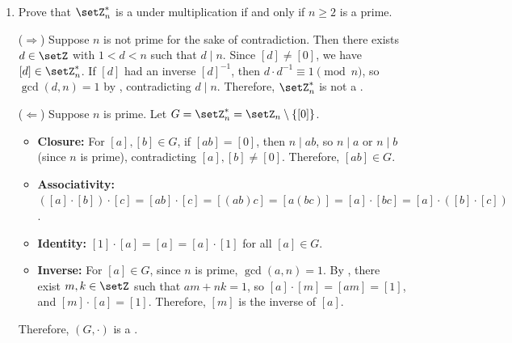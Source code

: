 \begin{enumerate}
\begin{subprove}
\begin{center}
\begin{tabular}{|c|c|c|c|c|c|}
    \hline
    \([3]\) & \([3]\) & \([0]\) & \([3]\) & \([0]\) & \([3]\) \\
    \hline
    \([4]\) & \([4]\) & \([2]\) & \([0]\) & \([4]\) & \([2]\) \\
    \hline
    \([5]\) & \([5]\) & \([4]\) & \([3]\) & \([2]\) & \([1]\) \\
    \hline
    \end{tabular}
    \end{center}
    \((\setZ_{6}^{*}, \cdot)\) is \textbf{NOT} a : not closed since \([2] \cdot [3] = [0] \notin \setZ_{6}^{*}\). Since \(6\) is not prime, \(\gcd(2, 6) = 2 \neq 1\) and \(\gcd(3, 6) = 3 \neq 1\). By , there are no \(m, k \in \setZ\) such that \(2 m + 6 k = 1\) or \(3 m + 6 k = 1\), so \([2]\) and \([3]\) have no multiplicative inverses.
  \end{subprove}
  \newpage
  \item Prove that \(\setZ_{n}^{*}\) is a  under 
  multiplication if and only if \(n \geq 2\) is a prime.
  \begin{subprove}
    (\(\Rightarrow\)) Suppose \(n\) is not prime for the sake of contradiction. 
    Then there exists \(d \in \setZ\) with \(1 < d < n\) such that \(d \mid n\).
    Since \([d] \neq [0]\), we have \([d] \in \setZ_{n}^{*}\). 
    If \([d]\) had an inverse \([d]^{-1}\), then 
    \(d \cdot d^{-1} \equiv 1 \pmod{n}\), so \(\gcd(d, n) = 1\) 
    by , contradicting \(d \mid n\). 
    Therefore, \(\setZ_{n}^{*}\) is not a .

    (\(\Leftarrow\)) Suppose \(n\) is prime. Let \(G = \setZ_{n}^{*} = \setZ_{n} \setminus \{[0]\}\).
    \begin{itemize}
      \item \textbf{Closure:} For \([a], [b] \in G\), if \([a b] = [0]\), then \(n \mid a b\), so \(n \mid a\) or \(n \mid b\) (since \(n\) is prime), contradicting \([a], [b] \neq [0]\). Therefore, \([a b] \in G\).
      \item \textbf{Associativity:} \(([a] \cdot [b]) \cdot [c] = [a b] \cdot [c] = [(a b) c] = [a (b c)] = [a] \cdot [b c] = [a] \cdot ([b] \cdot [c])\).
      \item \textbf{Identity:} \([1] \cdot [a] = [a] = [a] \cdot [1]\) for all \([a] \in G\).
      \item \textbf{Inverse:} For \([a] \in G\), since \(n\) is prime, \(\gcd(a, n) = 1\). By , there exist \(m, k \in \setZ\) such that \(a m + n k = 1\), so \([a] \cdot [m] = [a m] = [1]\), and \([m] \cdot [a] = [1]\). Therefore, \([m]\) is the inverse of \([a]\).
    \end{itemize}
    Therefore, \((G, \cdot)\) is a .
  \end{subprove}
\end{enumerate}
